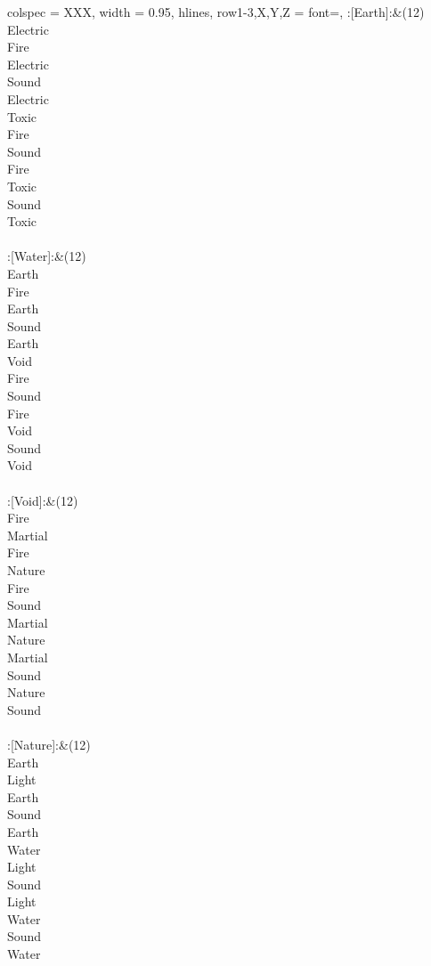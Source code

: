 \twocolumn
\begin{longtblr}[
	caption = {2v1 Defending Resisted},
	label = {2v1-Defending-Resisted},
]{
	colspec = {XXX}, width = 0.95\linewidth,
	hlines,
	row{1-3,X,Y,Z} = {font=\bfseries},
}
	:[Earth]:&{(12)\\
	Electric \\
	Fire \\
	Electric \\
	Sound \\
	Electric \\
	Toxic \\
	Fire \\
	Sound \\
	Fire \\
	Toxic \\
	Sound \\
	Toxic \\
	}\\

	:[Water]:&{(12)\\
	Earth \\
	Fire \\
	Earth \\
	Sound \\
	Earth \\
	Void \\
	Fire \\
	Sound \\
	Fire \\
	Void \\
	Sound \\
	Void \\
	}\\

	:[Void]:&{(12)\\
	Fire \\
	Martial \\
	Fire \\
	Nature \\
	Fire \\
	Sound \\
	Martial \\
	Nature \\
	Martial \\
	Sound \\
	Nature \\
	Sound \\
	}\\

	:[Nature]:&{(12)\\
	Earth \\
	Light \\
	Earth \\
	Sound \\
	Earth \\
	Water \\
	Light \\
	Sound \\
	Light \\
	Water \\
	Sound \\
	Water \\
	}\\


\end{longtblr}
